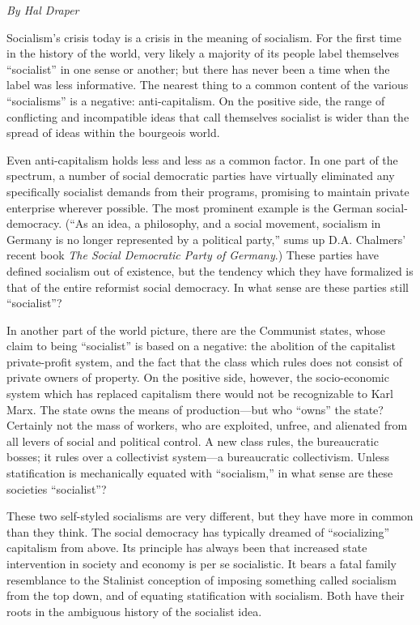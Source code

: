 \emph{By Hal Draper}

Socialism's crisis today is a crisis in the meaning of socialism. For the first time in the history of the world, very likely a majority of its people label themselves ``socialist'' in one sense or another; but there has never been a time when the label was less informative. The nearest thing to a common content of the various ``socialisms'' is a negative: anti-capitalism. On the positive side, the range of conflicting and incompatible ideas that call themselves socialist is wider than the spread of ideas within the bourgeois world.

Even anti-capitalism holds less and less as a common factor. In one part of the spectrum, a number of social democratic parties have virtually eliminated any specifically socialist demands from their programs, promising to maintain private enterprise wherever possible. The most prominent example is the German social-democracy. (``As an idea, a philosophy, and a social movement, socialism in Germany is no longer represented by a political party,'' sums up D.A. Chalmers' recent book \emph{The Social Democratic Party of Germany}.) These parties have defined socialism out of existence, but the tendency which they have formalized is that of the entire reformist social democracy. In what sense are these parties still ``socialist''?

In another part of the world picture, there are the Communist states, whose claim to being ``socialist'' is based on a negative: the abolition of the capitalist private-profit system, and the fact that the class which rules does not consist of private owners of property. On the positive side, however, the socio-economic system which has replaced capitalism there would not be recognizable to Karl Marx. The state owns the means of production---but who ``owns'' the state? Certainly not the mass of workers, who are exploited, unfree, and alienated from all levers of social and political control. A new class rules, the bureaucratic bosses; it rules over a collectivist system---a bureaucratic collectivism. Unless statification is mechanically equated with ``socialism,'' in what sense are these societies ``socialist''?

These two self-styled socialisms are very different, but they have more in common than they think. The social democracy has typically dreamed of ``socializing'' capitalism from above. Its principle has always been that increased state intervention in society and economy is per se socialistic. It bears a fatal family resemblance to the Stalinist conception of imposing something called socialism from the top down, and of equating statification with socialism. Both have their roots in the ambiguous history of the socialist idea.

